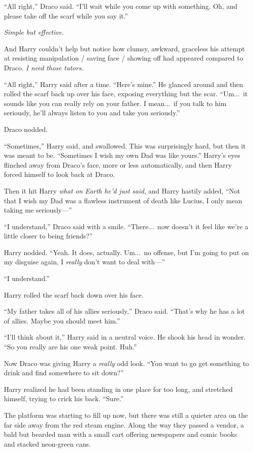 “All right,” Draco said. “I’ll wait while you come up with something. Oh, and please take off the scarf while you say it.”

\emph{Simple but effective.}

And Harry couldn’t help but notice how clumsy, awkward, graceless his attempt at resisting manipulation / saving face / showing off had appeared compared to Draco. \emph{I need those tutors.}

“All right,” Harry said after a time. “Here’s mine.” He glanced around and then rolled the scarf back up over his face, exposing everything but the scar. “Um...\ it sounds like you can really rely on your father. I mean...\ if you talk to him seriously, he’ll always listen to you and take you seriously.”

Draco nodded.

“Sometimes,” Harry said, and swallowed. This was surprisingly hard, but then it was meant to be. “Sometimes I wish my own Dad was like yours.” Harry’s eyes flinched away from Draco’s face, more or less automatically, and then Harry forced himself to look back at Draco.

Then it hit Harry \emph{what on Earth he’d just said}, and Harry hastily added, “Not that I wish my Dad was a flawless instrument of death like Lucius, I only mean taking me seriously—”

“I understand,” Draco said with a smile. “There...\ now doesn’t it feel like we’re a little closer to being friends?”

Harry nodded. “Yeah. It does, actually. Um...\ no offense, but I’m going to put on my disguise again, I \emph{really} don’t want to deal with—”

“I understand.”

Harry rolled the scarf back down over his face.

“My father takes all of his allies seriously,” Draco said. “That’s why he has a lot of allies. Maybe you should meet him.”

“I’ll think about it,” Harry said in a neutral voice. He shook his head in wonder. “So you really are his one weak point. Huh.”

Now Draco was giving Harry a \emph{really} odd look. “You want to go get something to drink and find somewhere to sit down?”

Harry realized he had been standing in one place for too long, and stretched himself, trying to crick his back. “Sure.”

The platform was starting to fill up now, but there was still a quieter area on the far side away from the red steam engine. Along the way they passed a vendor, a bald but bearded man with a small cart offering newspapers and comic books and stacked neon-green cans.

